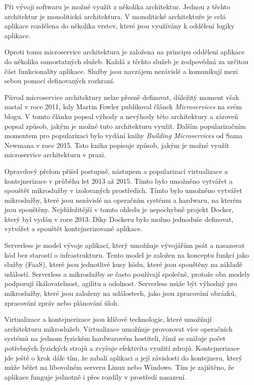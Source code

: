 Při vývoji softwaru je možné využít z několika architektur. Jednou z těchto architektur je monolitická architektura. V monolitické architektuře je celá aplikace rozdělena do několika vrstev, které jsou využívány k oddělení logiky aplikace.

Oproti tomu microservice architektura je založena na principu oddělení aplikace do několika samostatných služeb. Každá z těchto služeb je zodpovědná za určitou část funkcionality aplikace. Služby jsou navzájem nezávislé a komunikují mezi sebou pomocí definovaných rozhraní. \cite{Richardson2018}

Původ microservice architektury nelze přesně definovat, důležitý moment však nastal v roce 2011, kdy Martin Fowler publikoval článek \textit{Microservices} na svém blogu. V tomto článku popsal výhody a nevýhody této architektury a zároveň popsal způsob, jakým je možné tuto architekturu využít. Dalším popularizačním momentem pro popularizaci bylo vydání knihy \textit{Building Microservices} od Sama Newmana v roce 2015. Tato kniha popisuje způsob, jakým je možné využít microservice architekturu v praxi.

Opravdový přelom přišel postupně, nástupem a popularizací virtualizace a kontejnerizace v průběhu let 2013 až 2015. Tímto bylo umožněno vytvářet a spouštět mikroslužby v izolovaných prostředích. Tímto bylo umožněno vytvářet mikroslužby, které jsou nezávislé na operačním systému a hardwaru, na kterém jsou spouštěny. Nejdůležitější v tomto ohledu je nepochybně projekt Docker, který byl vydán v roce 2013. Díky Dockeru bylo možno jednoduše definovat, vytvářet a spouštět kontejnerizované aplikace.



Serverless je model vývoje aplikací, který umožňuje vývojářům psát a nasazovat kód bez starostí o infrastrukturu. Tento model je založen na konceptu funkcí jako služby (FaaS), které jsou jednotlivé kusy kódu, které jsou spouštěny na základě událostí. Serverless a mikroslužby se často používají společně, protože oba modely podporují škálovatelnost, agilitu a odolnost. Serverless může být výhodný pro mikroslužby, které jsou založeny na událostech, jako jsou zpracování obrázků, zpracování zpráv nebo plánování úloh.



Virtualizace a kontejnerizace jsou klíčové technologie, které umožňují architekturu mikroslužeb. Virtualizace umožňuje provozovat více operačních systémů na jednom fyzickém hardwarovém hostiteli, čímž se snižuje počet potřebných fyzických strojů a zvyšuje efektivita využití zdrojů. Kontejnerizace jde ještě o krok dále tím, že zabalí aplikaci a její závislosti do kontejneru, který může běžet na libovolném serveru Linux nebo Windows. Tím je zajištěno, že aplikace funguje jednotně i přes rozdíly v prostředí nasazení.

